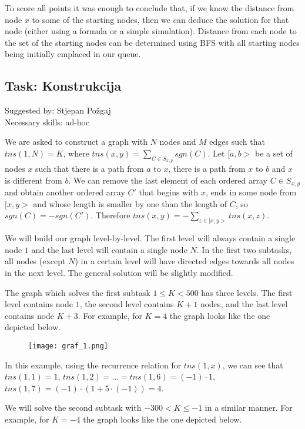 \documentclass[a4paper]{article}
\begin{document}
To score all points it was enough to conclude that, if we know the distance
from node $x$ to some of the starting nodes, then we can deduce the solution
for that node (either using a formula or a simple simulation). Distance from
each node to the set of the starting nodes can be determined using BFS with
all starting nodes being initially emplaced in our queue.

\clearpage

\subsection*{Task: Konstrukcija}
\textsf{Suggested by: Stjepan Požgaj}\\
\textsf{Necessary skills: ad-hoc}

We are asked to construct a graph with $N$ nodes and $M$ edges such that
$tns(1, N) = K$, where $tns(x, y)=\sum_{C \in S_{x,y}}{sgn(C)}$. Let $[a, b>$
be a set of nodes $x$ such that there is a path from $a$ to $x$, there is a
path from $x$ to $b$ and $x$ is different from $b$. We can remove the last
element of each ordered array $C \in S_{x, y}$ and obtain another ordered array
$C'$ that begins with $x$, ends in some node from $[x, y>$ and whose length is
smaller by one than the length of $C$, so $sgn(C) = -sgn(C')$. Therefore
$tns(x, y) = -\sum_{z \in [x, y>}{tns(x,z)}$.

We will build our graph level-by-level. The first level will always contain 
a single node $1$ and the last level will contain a single node $N$. In the
first two subtasks, all nodes (except $N$) in a certain level will have directed
edges towards all nodes in the next level. The general solution will be slightly
modified.

The graph which solves the first subtask $1 \le K < 500$ has three levels.
The first level contains node $1$, the second level contains $K + 1$ nodes, and
the last level contains node $K + 3$. For example, for $K=4$ the graph looks
like the one depicted below.

\begin{figure}[!htbp]
\centering
\texttt{[image: graf\_1.png]}
\end{figure}

In this example, using the recurrence relation for  $tns(1, x)$, we can see that 
$tns(1, 1) = 1$, $tns(1, 2) = \dots = tns(1, 6) = (-1) \cdot 1$, $tns(1, 7) =
(-1) \cdot (1 + 5 \cdot (-1)) = 4$.

We will solve the second subtask with $-300 < K \le -1$ in a similar manner.
For example, for $K=-4$ the graph looks like the one depicted below.
\end{document}
